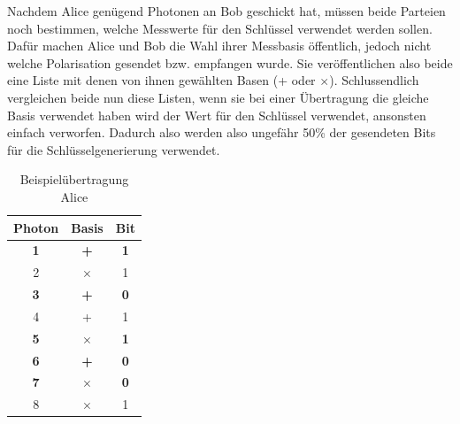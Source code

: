 Nachdem Alice genügend Photonen an Bob geschickt hat, müssen beide Parteien noch bestimmen, welche Messwerte für den Schlüssel verwendet werden sollen.
Dafür machen Alice und Bob die Wahl ihrer Messbasis öffentlich, jedoch nicht welche Polarisation gesendet bzw. empfangen wurde. Sie veröffentlichen also beide eine Liste mit denen von ihnen gewählten Basen (+ oder $\times$).
Schlussendlich vergleichen beide nun diese Listen, wenn sie bei einer Übertragung die gleiche Basis verwendet haben wird der Wert für den Schlüssel verwendet, ansonsten einfach verworfen.
Dadurch also werden also ungefähr 50\% der gesendeten Bits für die Schlüsselgenerierung verwendet.

\begin{table}[!htb]
    \parbox{.45\linewidth}{
        \centering
        \begin{tabular}{|c|c|c|}
        \hline
        Photon      & Basis             & Bit           \\ \hline
        \textbf{1}  & \textbf{+}        & \textbf{1}    \\ \hline
        2           & $\times$          & 1             \\ \hline 
        \textbf{3}  & \textbf{+}        & \textbf{0}    \\ \hline
        4           & +                 & 1             \\ \hline
        \textbf{5}  & \textbf{$\times$} & \textbf{1}    \\ \hline
        \textbf{6}  & \textbf{+}        & \textbf{0}    \\ \hline
        \textbf{7}  & \textbf{$\times$} & \textbf{0}    \\ \hline
        8           & $\times$          & 1             \\ \hline
        \end{tabular}
        \caption{Beispielübertragung Alice}    
    }

    

\end{table}

